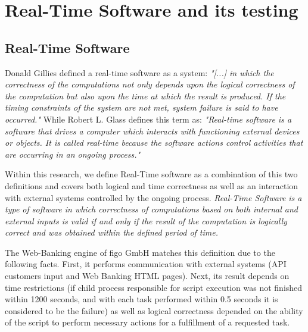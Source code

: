 \chapter{Real-Time Software and its testing}
\label{chap:rt}
\section{Real-Time Software}
Donald Gillies \cite{rtG} defined a real-time software as a system: \textit{"[...] in which the correctness of the computations not only depends upon the logical correctness of the computation but also upon the time at which the result is produced. If the timing constraints of the system are not met, system failure is said to have occurred."} While Robert L. Glass \cite{RealTimeTesting} defines this term as: \textit{"Real-time software is a software that drives a computer which interacts with functioning external devices or objects. It is called real-time because the software actions control activities that are occurring in an ongoing process."} 

Within this research, we define  Real-Time software as a combination of this two definitions and covers both logical and time correctness as well as an interaction with external systems controlled by the ongoing process. \textit{Real-Time Software} \textit{is a type of software in which correctness of computations based on both internal and external inputs is valid if and only if the result of the computation is logically correct and was obtained within the defined period of time.}

The Web-Banking engine of figo GmbH matches this definition due to the following facts. First, it performs communication with external systems (API customers input and Web Banking HTML pages). Next, its result depends on time restrictions (if child process responsible for script execution was not finished within 1200 seconds, and with each task performed within 0.5 seconds it is considered to be the failure) as well as logical correctness depended on the ability of the script to perform necessary actions for a fulfillment of a requested task.



